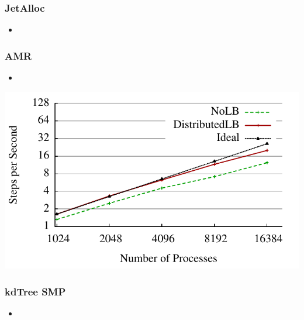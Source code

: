 \begin{frame}
\frametitle{JetAlloc}
%
\begin{itemize}
\item
\end{itemize}
%
\end{frame}

\begin{frame}
\frametitle{AMR}
%
\begin{itemize}
\item
\end{itemize}
%
\includegraphics[scale=0.7]{../figures/amr_scaling_distlb.pdf}
\end{frame}

\begin{frame}
\frametitle{kdTree SMP}
%
\begin{itemize}
\item
\end{itemize}
%
\end{frame}

